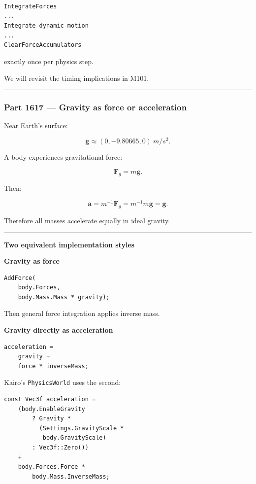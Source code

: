 \begin{verbatim}
IntegrateForces
...
Integrate dynamic motion
...
ClearForceAccumulators
\end{verbatim}

exactly once per physics step.

We will revisit the timing implications in M101.

\begin{center}\rule{0.5\linewidth}{0.5pt}\end{center}

\subsubsection{Part 1617 --- Gravity as force or acceleration}\label{part-1617-gravity-as-force-or-acceleration}

Near Earth's surface:

\[
\mathbf{g}
\approx
(0,-9.80665,0)
\ m/s^2.
\]

A body experiences gravitational force:

\[
\boxed{
\mathbf{F}_g
=
m\mathbf{g}.
}
\]

Then:

\[
\mathbf{a}
=
m^{-1}\mathbf{F}_g
=
m^{-1}m\mathbf{g}
=
\mathbf{g}.
\]

Therefore all masses accelerate equally in ideal gravity.

\begin{center}\rule{0.5\linewidth}{0.5pt}\end{center}

\textbf{Two equivalent implementation styles}

\textbf{Gravity as force}

\begin{verbatim}
AddForce(
    body.Forces,
    body.Mass.Mass * gravity);
\end{verbatim}

Then general force integration applies inverse mass.

\textbf{Gravity directly as acceleration}

\begin{verbatim}
acceleration =
    gravity +
    force * inverseMass;
\end{verbatim}

Kairo's \texttt{PhysicsWorld} uses the second:

\begin{verbatim}
const Vec3f acceleration =
    (body.EnableGravity
        ? Gravity *
          (Settings.GravityScale *
           body.GravityScale)
        : Vec3f::Zero())
    +
    body.Forces.Force *
        body.Mass.InverseMass;
\end{verbatim}

